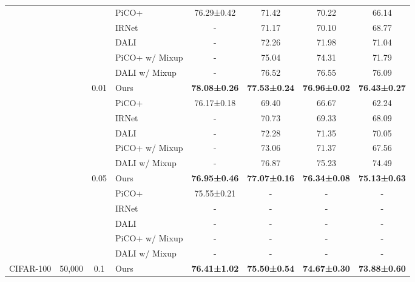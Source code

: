 \begin{table}[h!]
{\begin{tabular}{@{}c|c|c|l|cccc@{}}
   \\ \toprule
   &
   &
   &
  PiCO+ \citep{wang2022pico+} &
  76.29\scriptsize{±0.42} &
  71.42 &
  70.22 &
  66.14 \\
 &
   &
   &
  IRNet \citep{lian2022irnet} &
  - &
  71.17 &
  70.10 &
  68.77 \\
 &
   &
   &
  DALI \citep{xu2023dali} &
  - &
  72.26 &
  71.98 &
  71.04 \\
 &
   &
   &
  PiCO+ w/ Mixup \citep{xu2023dali} &
  - &
  75.04 &
  74.31 &
  71.79 \\
 &
   &
   &
  DALI w/ Mixup \citep{xu2023dali} &
  - &
  76.52 &
  76.55 &
  76.09 \\
 &
   &
  \multirow{-6}{*}{0.01} &
  Ours &
  \textbf{78.08\scriptsize{±0.26}} &
  \textbf{77.53\scriptsize{±0.24}} &
  \textbf{76.96\scriptsize{±0.02}} &
  \textbf{76.43\scriptsize{±0.27}} \\ \cmidrule(l){3-8} 
 &
   &
   &
  PiCO+ \citep{wang2022pico+} &
  76.17\scriptsize{±0.18} &
  69.40 &
  66.67 &
  62.24 \\
 &
   &
   &
  IRNet \citep{lian2022irnet} &
  - &
  70.73 &
  69.33 &
  68.09 \\
 &
   &
   &
  DALI \citep{xu2023dali} &
  - &
  72.28 &
  71.35 &
  70.05 \\
 &
   &
   &
   PiCO+ w/ Mixup \citep{xu2023dali} &
  - &
  73.06 &
  71.37 &
  67.56 \\
 &
   &
   &
 DALI w/ Mixup \citep{xu2023dali} &
  - &
  76.87 &
  75.23 &
  74.49 \\
 &
   &
  \multirow{-6}{*}{0.05} &
  Ours &
  \textbf{76.95\scriptsize{±0.46}} &
  \textbf{77.07\scriptsize{±0.16}} &
  \textbf{76.34\scriptsize{±0.08}} &
  \textbf{75.13\scriptsize{±0.63}} \\ \cmidrule(l){3-8} 
 &
   &
   &
  PiCO+ \citep{wang2022pico+} &
  75.55\scriptsize{±0.21} &
  - &
  - &
  - \\
 &
   &
   &
  IRNet \citep{lian2022irnet} &
  - &
  - &
  - &
  - \\
 &
   &
   &
  DALI \citep{xu2023dali} &
  - &
  - &
  - &
  - \\
 &
   &
   &
  PiCO+ w/ Mixup \citep{xu2023dali} &
  - &
  - &
  - &
  - \\
 &
   &
   &
  DALI w/ Mixup \citep{xu2023dali} &
  - &
  - &
  - &
  - \\
\multirow{-18}{*}{CIFAR-100} &
  \multirow{-18}{*}{50,000} &
  \multirow{-6}{*}{0.1} &
  Ours &
  \textbf{76.41\scriptsize{±1.02}} &
  \textbf{75.50\scriptsize{±0.54}} &
  \textbf{74.67\scriptsize{±0.30}} &
  \textbf{73.88\scriptsize{±0.60}} \\ 
  \bottomrule

\end{tabular}}
\end{table}







\newpage 


